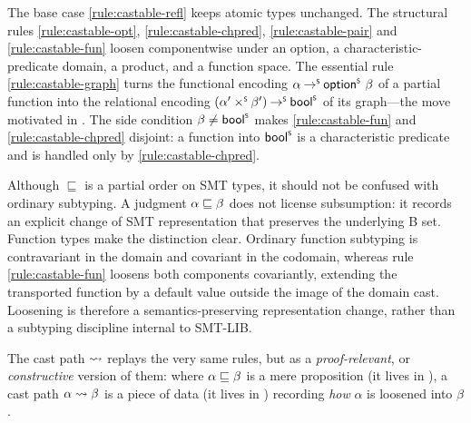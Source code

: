 The base case \ref{rule:castable-refl} keeps atomic types unchanged. The structural rules \ref{rule:castable-opt}, \ref{rule:castable-chpred}, \ref{rule:castable-pair} and \ref{rule:castable-fun} loosen componentwise under an option, a characteristic-predicate domain, a product, and a function space. The essential rule \ref{rule:castable-graph} turns the functional encoding $\alpha \mathbin{\to^{\scriptscriptstyle{\mathsf{S}}}} \mathord{\mathsf{option}^{\scriptscriptstyle{\mathsf{S}}}}\,\,\beta$ of a partial function into the relational encoding $(\alpha' \mathbin{\times^{\scriptscriptstyle{\mathsf{S}}}} \beta') \mathbin{\to^{\scriptscriptstyle{\mathsf{S}}}} \mathsf{bool}^{\scriptscriptstyle{\mathsf{S}}}$ of its graph---the move motivated in . The side condition $\beta \neq \mathsf{bool}^{\scriptscriptstyle{\mathsf{S}}}$ makes \ref{rule:castable-fun} and \ref{rule:castable-chpred} disjoint: a function into $\mathsf{bool}^{\scriptscriptstyle{\mathsf{S}}}$ is a characteristic predicate and is handled only by \ref{rule:castable-chpred}.

\begin{remark}
Although $\sqsubseteq$ is a partial order on SMT types, it should not be confused with ordinary subtyping. A judgment $\alpha \sqsubseteq \beta$ does not license subsumption: it records an explicit change of SMT representation that preserves the underlying B set. Function types make the distinction clear. Ordinary function subtyping is contravariant in the domain and covariant in the codomain, whereas rule \ref{rule:castable-fun} loosens both components covariantly, extending the transported function by a default value outside the image of the domain cast. Loosening is therefore a semantics-preserving representation change, rather than a subtyping discipline internal to SMT-LIB.
\end{remark}

The cast path $ \rightsquigarrow $ replays the very same rules, but as a \emph{proof-relevant}, or \emph{constructive} version of them: where $\alpha \sqsubseteq \beta$ is a mere proposition (it lives in ), a cast path $\alpha \rightsquigarrow \beta$ is a piece of data (it lives in ) recording \emph{how} $\alpha$ is loosened into $\beta$.

